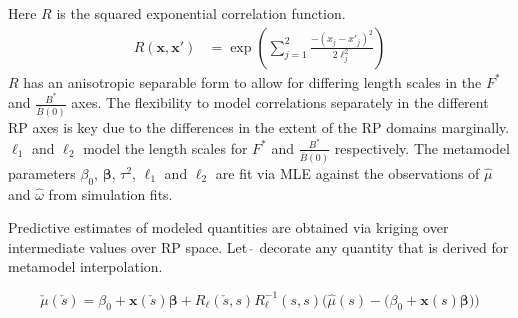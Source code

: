 \documentclass[12pt]{article}
\begin{document}
%
Here $R$ is the squared exponential correlation function.
\begin{align}   \label{corModel}
R(\bm{x}, \bm{x'}) &= \exp\left( \sum_{j=1}^2 \frac{-(x_j-x'_j)^2}{2\ell_j^2} \right) %
\end{align}
$R$ has an anisotropic separable form to allow for differing length scales in 
the $F^*$ and $\frac{B^*}{\bar B(0)}$ axes. The flexibility to model 
correlations separately in the different RP axes is key due to the 
differences in the extent of the RP domains marginally. $\ell_1$ and 
$\ell_2$ model the length scales for $F^*$ and $\frac{B^*}{\bar B(0)}$ 
respectively. The metamodel parameters $\beta_0$, $\bm{\beta}$, $\tau^2$, 
$\ell_1$ and $\ell_2$ are fit via MLE against the observations of $\hat\mu$ 
and $\hat\omega$ from  simulation fits. 

%
Predictive estimates of modeled quantities are obtained via kriging over 
intermediate values over RP space. Let $\check~$ decorate any quantity that is 
derived for metamodel interpolation.

\begin{equation}
	\check \mu(\check s) = \beta_0 + \bm{x}(\check s)\bm{\beta} + {R}_{\bm{\ell}}(\check s, s) {R}^{-1}_{\bm{\ell}}(s, s)\Big({\hat\mu}(s)-\big(\beta_0+\bm{x}(s)\bm{\beta}\big)\Big)
\end{equation}

\end{document}
